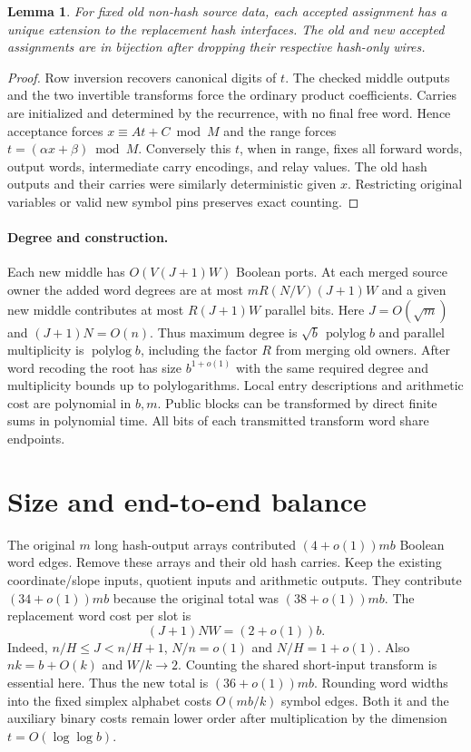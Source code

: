 \documentclass[11pt]{article}
\newtheorem{lemma}{Lemma}
\newcommand{\polylog}{\operatorname{polylog}}
\begin{document}
\begin{lemma}
For fixed old non-hash source data, each accepted assignment has a
unique extension to the replacement hash interfaces. The old and new
accepted assignments are in bijection after dropping their respective
hash-only wires.
\end{lemma}
\begin{proof}
Row inversion recovers canonical digits of $t$. The checked middle
outputs and the two invertible transforms force the ordinary product
coefficients. Carries are initialized and determined by the recurrence,
with no final free word. Hence acceptance forces $x\equiv At+C\bmod M$
and the range forces $t=(\alpha x+\beta)\bmod M$. Conversely this
$t$, when in range, fixes all forward words, output words, intermediate
carry encodings, and relay values. The old hash outputs and their
carries were similarly deterministic given $x$. Restricting original
variables or valid new symbol pins preserves exact counting.
\end{proof}

\paragraph{Degree and construction.}
Each new middle has $O(V(J+1)W)$ Boolean ports. At each merged source
owner the added word degrees are at most $mR(N/V)(J+1)W$ and a given
new middle contributes at most $R(J+1)W$ parallel bits.
Here $J=O(\sqrt m)$ and $(J+1)N=O(n)$. Thus maximum degree is
$\sqrt b\,\polylog b$ and parallel multiplicity is $\polylog b$,
including the factor $R$ from merging old owners. After word recoding
the root has size $b^{1+o(1)}$ with the same required degree and
multiplicity bounds up to polylogarithms. Local entry descriptions and
arithmetic cost are polynomial in $b,m$. Public blocks can be
transformed by direct finite sums in polynomial time. All bits of each
transmitted transform word share endpoints.

\section{Size and end-to-end balance}
The original $m$ long hash-output arrays contributed $(4+o(1))mb$
Boolean word edges. Remove these arrays and their old hash carries.
Keep the existing coordinate/slope inputs, quotient inputs and
arithmetic outputs. They contribute $(34+o(1))mb$ because the original
total was $(38+o(1))mb$. The replacement word cost per slot is
\[
  (J+1)NW=(2+o(1))b.
\]
Indeed, $n/H\le J<n/H+1$, $N/n=o(1)$ and $N/H=1+o(1)$.
Also $nk=b+O(k)$ and $W/k\to2$. Counting the shared short-input
transform is essential here. Thus the new total is $(36+o(1))mb$.
Rounding word widths into the fixed simplex alphabet costs $O(mb/k)$
symbol edges. Both it and the auxiliary binary costs remain lower order
after multiplication by the dimension $t=O(\log\log b)$.
\end{document}

